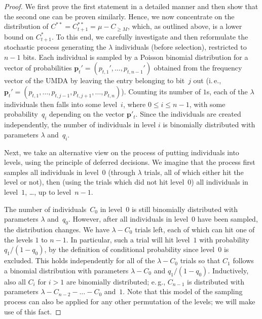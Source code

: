 \documentclass[11pt, a4paper]{article}
\newcommand{\umda}{UMDA\xspace}
\newcommand*{\cumulC}[1]{C_{\geq #1}}
\newcommand{\ie}{i.\,e.\xspace}
\newcommand{\eg}{e.\,g.\xspace}
\begin{document}
\begin{proof}%
We first prove the first statement in a detailed manner and then show that the second one can be proven similarly. 
Hence, we now concentrate on the distribution of $C^{**} = C^{**}_{t+1} =   
 \mu-\cumulC{M}$, which, as outlined above, is a lower bound 
on $C^*_{t+1}$. 
	To this end, we carefully investigate and then reformulate 
		the stochastic process generating the $\lambda$ individuals (before selection), 
	 restricted to 
		 $n-1$ bits. Each individual is 
		sampled by a Poisson binomial distribution for a vector of 
		probabilities $\bm{p}_t'=(p_{t,1}',\dots,p_{t,n-1}')$ 
		obtained from the frequency vector  of the \umda by leaving the entry belonging to bit~$j$ out 
		(\ie, $\bm{p}_t'=(p_{t,1},\dots,p_{t,j-1},p_{t,j+1},\dots,p_{t,n})$). 
		 Counting its 
			number of $1$s, each of the $\lambda$ individuals then falls into some 
			level~$i$, where $0\le i\le n-1$, with 
			some probability~$q_i$ depending on the vector $\bm{p}'_t$. Since 
			the individuals are created independently, the number 
			of individuals in level $i$ is binomially distributed with parameters $\lambda$ and~$q_i$. 
			
			Next, we take an alternative view on the process of putting individuals into levels, using 
			the principle of deferred decisions. We imagine that the 
			process first samples all individuals in level~$0$ (through $\lambda$ trials, all of which 
			either hit the level or not), then (using the trials which did not hit level~$0$) 
			all individuals in level~$1$, \dots, up  
			to level~$n-1$.
            
      The number of individuals~$C_{0}$
			in level~$0$ is still binomially distributed with parameters $\lambda$ 
			and~$q_{0}$. However, after all individuals in level~$0$  have 
			been sampled, the distribution changes. 
			We have $\lambda-C_{0}$ trials left, each of which can hit one of the 
			levels $1$ to $n-1$. In particular, such 
			a trial will hit level~$1$ with probability $q_{1}/(1-q_{0})$, 
			by the definition of conditional probability since level~$0$ is excluded. 
			This holds independently for all 
			of the $\lambda-C_{0}$ trials so that $C_{1}$ follows a binomial distribution with parameters 
			$\lambda-C_{0}$ and $q_{1}/(1-q_{0})$. Inductively, 
			also all $C_{i}$ for $i>1$ are binomially distributed; 
			\eg, $C_{n-1}$ is distributed with parameters $\lambda-C_{n-2}-\dots-C_{0}$ and~$1$. 
			Note that this model 
			of the sampling process can also be applied for any other permutation of the levels; we will make use 
			of this fact.
    

\end{proof}
\end{document}
